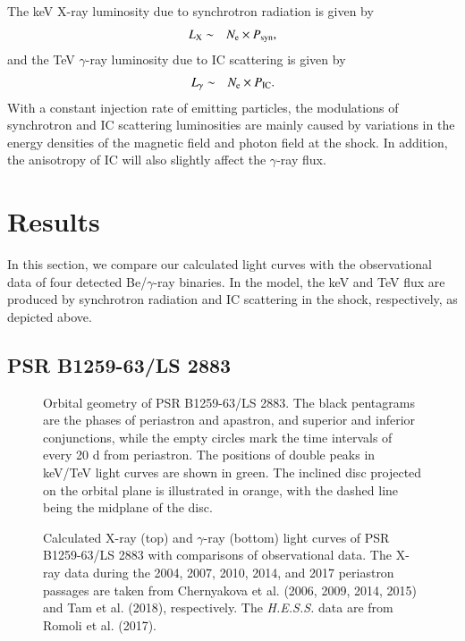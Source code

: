 \documentclass{aa}
\def\PSRB1259{PSR B1259-63/LS 2883}
\begin{document}
The keV X-ray luminosity due to synchrotron radiation is given by
\begin{eqnarray}\label{Lx}
  L_{\rm X}&\sim& N_{\rm e}\times P_{\rm syn},
\end{eqnarray}
and the TeV $\gamma$-ray luminosity due to IC scattering is given by
\begin{eqnarray}\label{Lg}
  L_{\rm \gamma}&\sim& N_{\rm e}\times P_{\rm IC}.
\end{eqnarray}
With a constant injection rate of emitting particles, the modulations of synchrotron and IC scattering luminosities are mainly caused by variations in the energy densities of the magnetic field and photon field at the shock. In addition, the anisotropy of IC will also
slightly affect the $\gamma$-ray flux.

\section{Results}
In this section, we compare our calculated light curves with the observational data of four detected Be/$\gamma$-ray binaries. In the model, the keV and TeV flux are produced by synchrotron radiation and IC scattering in the shock, respectively, as depicted above.

\subsection{\PSRB1259}
\begin{figure}
\caption{
Orbital geometry of \PSRB1259.
The black pentagrams are the phases of periastron and apastron, and superior and inferior conjunctions, while the empty circles mark the time intervals of every 20 d from periastron.
The positions of double peaks in keV/TeV light curves are shown in green.
The inclined disc projected on the orbital plane is illustrated in orange, with the dashed line being the midplane of the disc.
}
\label{fig:B1259_O}
\end{figure}

\begin{figure}
  \caption{
  Calculated X-ray (top) and $\gamma$-ray (bottom) light curves of \PSRB1259 with comparisons of observational data. The X-ray data during the 2004, 2007, 2010, 2014, and 2017 periastron passages are taken from Chernyakova et al. (2006, 2009, 2014, 2015) and Tam et al. (2018), respectively. The \textit{H.E.S.S.} data are from Romoli et al. (2017).
  }
  \label{fig:B1259}
\end{figure}
\end{document}
